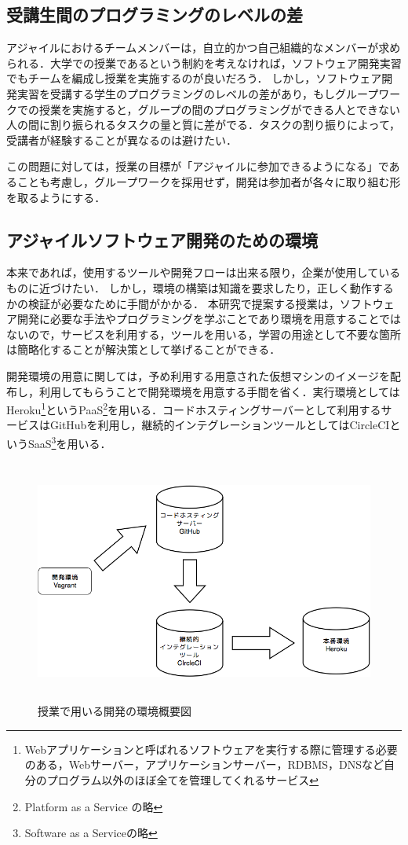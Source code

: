 \subsection{受講生間のプログラミングのレベルの差}

アジャイルにおけるチームメンバーは，自立的かつ自己組織的なメンバーが求められる．大学での授業であるという制約を考えなければ，ソフトウェア開発実習でもチームを編成し授業を実施するのが良いだろう．
しかし，ソフトウェア開発実習を受講する学生のプログラミングのレベルの差があり，もしグループワークでの授業を実施すると，グループの間のプログラミングができる人とできない人の間に割り振られるタスクの量と質に差がでる．タスクの割り振りによって，受講者が経験することが異なるのは避けたい．

この問題に対しては，授業の目標が「アジャイルに参加できるようになる」であることも考慮し，グループワークを採用せず，開発は参加者が各々に取り組む形を取るようにする．

\subsection{アジャイルソフトウェア開発のための環境}

本来であれば，使用するツールや開発フローは出来る限り，企業が使用しているものに近づけたい．
しかし，環境の構築は知識を要求したり，正しく動作するかの検証が必要なために手間がかかる．
本研究で提案する授業は，ソフトウェア開発に必要な手法やプログラミングを学ぶことであり環境を用意することではないので，サービスを利用する，ツールを用いる，学習の用途として不要な箇所は簡略化することが解決策として挙げることができる．

開発環境の用意に関しては，予め利用する用意された仮想マシンのイメージを配布し，利用してもらうことで開発環境を用意する手間を省く．実行環境としてはHeroku\footnote{Webアプリケーションと呼ばれるソフトウェアを実行する際に管理する必要のある，Webサーバー，アプリケーションサーバー，RDBMS，DNSなど自分のプログラム以外のほぼ全てを管理してくれるサービス}というPaaS\footnote{Platform as a Service の略}を用いる．コードホスティングサーバーとして利用するサービスはGitHubを利用し，継続的インテグレーションツールとしてはCircleCIというSaaS\footnote{Software as a Serviceの略}を用いる．


\begin{figure}[H]
\centering
\includegraphics[height=8cm]{./assets/images/class_dev_env.png}
\caption{授業で用いる開発の環境概要図}
\label{fig:class_dev_env}
\end{figure}
